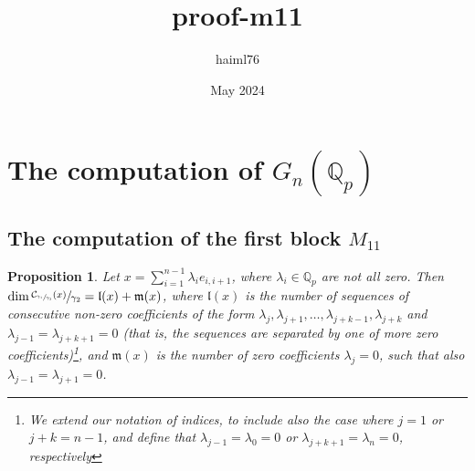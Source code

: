 \documentclass[12pt]{article}
\title{proof-m11}
\author{haiml76 }
\date{May 2024}
\newtheorem{proposition}[theorem]{Proposition}
\begin{document}
\section{The computation of $G_n(\mathbb{Q}_p)$}
\subsection{The computation of the first block $M_{11}$}
\begin{proposition}
\label{prop.centralizer.dimension}
Let $x=\sum_{i=1}^{n-1}\lambda_i e_{i,i+1}$, where $\lambda_i\in\mathbb{Q}_p$ are not all zero. Then $\dim\sfrac{\mathcal{C}_{\sfrac{\gamma_1}{\gamma_3}}(x)}{\gamma_2}=\mathfrak{l}(x)+\mathfrak{m}(x)$, where $\mathfrak{l}(x)$ is the number of sequences of consecutive non-zero coefficients of the form $\lambda_j,\lambda_{j+1},\dots,\lambda_{j+k-1},\lambda_{j+k}$ and $\lambda_{j-1}=\lambda_{j+k+1}=0$ (that is, the sequences are separated by one of more zero coefficients)\footnote{We extend our notation of indices, to include also the case where $j=1$ or $j+k=n-1$, and define that $\lambda_{j-1}=\lambda_0=0$ or $\lambda_{j+k+1}=\lambda_n=0$, respectively}, and $\mathfrak{m}(x)$ is the number of zero coefficients $\lambda_j=0$, such that also $\lambda_{j-1}=\lambda_{j+1}=0$.
\end{proposition}
\end{document}
